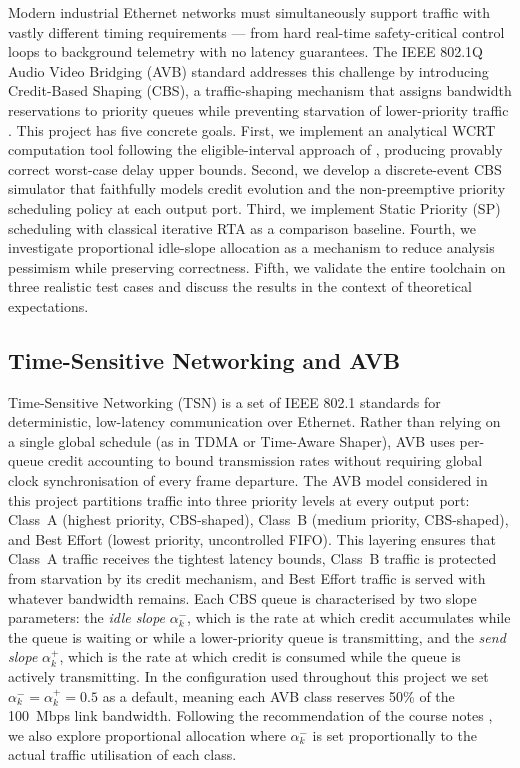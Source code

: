 \documentclass[11pt,a4paper]{article}
\begin{document}
Modern industrial Ethernet networks must simultaneously support traffic with
vastly different timing requirements --- from hard real-time safety-critical
control loops to background telemetry with no latency guarantees.
The IEEE 802.1Q Audio Video Bridging (AVB) standard addresses this challenge
by introducing Credit-Based Shaping (CBS), a traffic-shaping mechanism
that assigns bandwidth reservations to priority queues while preventing
starvation of lower-priority traffic \cite{Cao2016}.
This project has five concrete goals.
First, we implement an analytical WCRT computation tool following the
eligible-interval approach of \cite{Cao2016,Cao2018}, producing provably
correct worst-case delay upper bounds.
Second, we develop a discrete-event CBS simulator that faithfully models
credit evolution and the non-preemptive priority scheduling policy at each
output port.
Third, we implement Static Priority (SP) scheduling with classical iterative
RTA as a comparison baseline.
Fourth, we investigate proportional idle-slope allocation as a mechanism to
reduce analysis pessimism while preserving correctness.
Fifth, we validate the entire toolchain on three realistic test cases and
discuss the results in the context of theoretical expectations.

\subsection{Time-Sensitive Networking and AVB}

Time-Sensitive Networking (TSN) is a set of IEEE 802.1 standards for
deterministic, low-latency communication over Ethernet.
Rather than relying on a single global schedule (as in TDMA or Time-Aware
Shaper), AVB uses per-queue credit accounting to bound transmission rates
without requiring global clock synchronisation of every frame departure.
The AVB model considered in this project partitions traffic into three
priority levels at every output port: Class~A (highest priority, CBS-shaped),
Class~B (medium priority, CBS-shaped), and Best Effort (lowest priority,
uncontrolled FIFO).
This layering ensures that Class~A traffic receives the tightest latency
bounds, Class~B traffic is protected from starvation by its credit mechanism,
and Best Effort traffic is served with whatever bandwidth remains.
Each CBS queue is characterised by two slope parameters: the \emph{idle
slope} $\alpha^-_k$, which is the rate at which credit accumulates while
the queue is waiting or while a lower-priority queue is transmitting, and
the \emph{send slope} $\alpha^+_k$, which is the rate at which credit is
consumed while the queue is actively transmitting.
In the configuration used throughout this project we set
$\alpha^-_k = \alpha^+_k = 0.5$ as a default, meaning each AVB class
reserves 50\% of the 100~Mbps link bandwidth.
Following the recommendation of the course notes \cite{CBSnotes}, we also
explore proportional allocation where $\alpha^-_k$ is set proportionally
to the actual traffic utilisation of each class.
\end{document}
